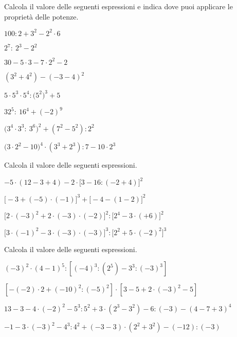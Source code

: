 \begin{esercizio}[\Ast]
Calcola il valore delle seguenti espressioni e indica dove puoi applicare le 
proprietà delle potenze.
\begin{multicols}{2}
\begin{enumeratea}
 \item \(100:2+3^2 -2^2\cdot 6\)
 \item \(2^7:~2^3 -2^2\)
 \item \(30-5\cdot 3 -7\cdot 2^2 -2\)
 \item \((3^2 +4^2) -(-3-4)^2\)
 \item \(5\cdot 5^3\cdot 5^4: \big(5^2\big)^3 +5\)
 \item \(32^5:~16^4 +(-2)^9\)
 \item \(\big(3^4\cdot 3^3:~3^6\big)^2 +(7^2-5^2):2^2\)
 \item \(\big(3\cdot 2^2 -10\big)^4\cdot (3^3+2^3):7-10\cdot 2^3\)
\end{enumeratea}
\end{multicols}
\end{esercizio}

\begin{esercizio}[\Ast]
Calcola il valore delle seguenti espressioni.
 \begin{enumeratea}
 \item \(-5\cdot(12-3+4)-2\cdot\big[3-16:(-2+4)\big]^2\)
 \item \(\big[-3+(-5)\cdot(-1)\big]^3+\big[-4-(1-2)\big]^2\)
 \item \(\big[2\cdot(-3)^2+2\cdot(-3)\cdot(-2)\big]^2:\big[2^4-3\cdot(+6)\big]^2\)
 \item 
\(\big[3\cdot(-1)^2-3\cdot(-3)\cdot(-3)\big]^3:\big[2^2+5\cdot(-2)^2\big]^3\)
 \end{enumeratea}
\end{esercizio}

\begin{esercizio}[\Ast]
Calcola il valore delle seguenti espressioni.
 \begin{enumeratea}
 \item \((-3)^2\cdot(4-1)^5:[(-4)^3:(2^5)-3^3:(-3)^3]\)
 \item \([-(-2)\cdot2+(-10)^2:(-5)^2]\cdot[3-5+2\cdot(-3)^2-5]\)
 \item \(13-3-4\cdot(-2)^2-5^3:5^2+3\cdot(2^3-3^2)-6:(-3)-(4-7+3)^4\)
 \item \(-1-3\cdot(-3)^2-4^3:4^2+(-3-3)\cdot(2^2+3^2)-(-12):(-3)\)
 \end{enumeratea}
\end{esercizio}

